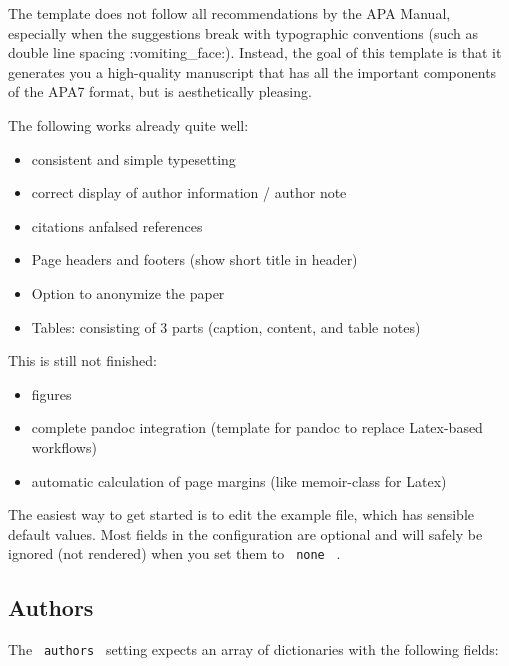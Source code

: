 The template does not follow all recommendations by the APA Manual,
especially when the suggestions break with typographic conventions (such
as double line spacing :vomiting\_face:). Instead, the goal of this
template is that it generates you a high-quality manuscript that has all
the important components of the APA7 format, but is aesthetically
pleasing.

The following works already quite well:

\begin{itemize}
\tightlist
\item
  consistent and simple typesetting
\item
  correct display of author information / author note
\item
  citations anfalsed references
\item
  Page headers and footers (show short title in header)
\item
  Option to anonymize the paper
\item
  Tables: consisting of 3 parts (caption, content, and table notes)
\end{itemize}

This is still not finished:

\begin{itemize}
\tightlist
\item
  figures
\item
  complete pandoc integration (template for pandoc to replace
  Latex-based workflows)
\item
  automatic calculation of page margins (like memoir-class for Latex)
\end{itemize}

The easiest way to get started is to edit the example file, which has
sensible default values. Most fields in the configuration are optional
and will safely be ignored (not rendered) when you set them to
\texttt{\ none\ } .

\subsection{Authors}\label{authors}

The \texttt{\ authors\ } setting expects an array of dictionaries with
the following fields:

\begin{Shaded}
\begin{Highlighting}[]
\NormalTok{(}
\NormalTok{)}
\end{Highlighting}
\end{Shaded}


